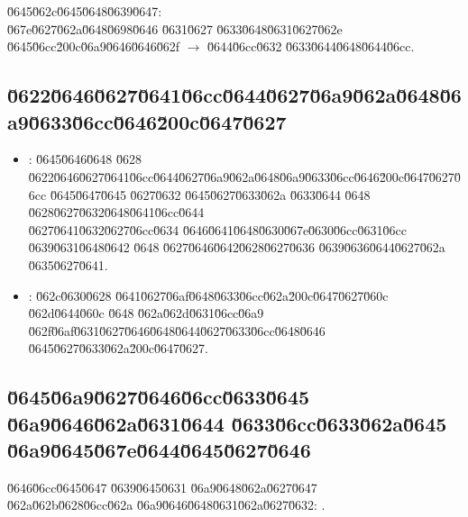\documentclass[12pt,a4paper]{article}
\begin{document}
\u0645\u062c\u0645\u0648\u0639\u0647:  \\
\u067e\u0627\u062a\u0648\u0698\u0646 \u0631\u0627 \u0633\u0648\u0631\u0627\u062e \u0645\u06cc\u200c\u06a9\u0646\u0646\u062f $\rightarrow$ \u0644\u06cc\u0632 \u0633\u0644\u0648\u0644\u06cc.

\subsection*{\u0622\u0646\u0627\u0641\u06cc\u0644\u0627\u06a9\u062a\u0648\u06a9\u0633\u06cc\u0646\u200c\u0647\u0627}
\begin{itemize}
\item {}: \u0645\u0646\u0648 \u0628 \u0622\u0646\u0627\u0641\u06cc\u0644\u0627\u06a9\u062a\u0648\u06a9\u0633\u06cc\u0646\u200c\u0647\u0627\u06cc \u0645\u0647\u0645 \u0627\u0632 \u0645\u0627\u0633\u062a \u0633\u0644 \u0648 \u0628\u0627\u0632\u0648\u0641\u06cc\u0644 \\
\u0627\u0641\u0632\u0627\u06cc\u0634 \u0646\u0641\u0648\u0630\u067e\u0630\u06cc\u0631\u06cc \u0639\u0631\u0648\u0642 \u0648 \u0627\u0646\u0642\u0628\u0627\u0636 \u0639\u0636\u0644\u0627\u062a \u0635\u0627\u0641.
\item {}: \u062c\u0630\u0628 \u0641\u0627\u06af\u0648\u0633\u06cc\u062a\u200c\u0647\u0627\u060c \u062d\u0644\u060c \u0648 \u062a\u062d\u0631\u06cc\u06a9 \u062f\u06af\u0631\u0627\u0646\u0648\u0644\u0627\u0633\u06cc\u0648\u0646 \u0645\u0627\u0633\u062a\u200c\u0647\u0627.
\end{itemize}

\subsection*{\u0645\u06a9\u0627\u0646\u06cc\u0633\u0645 \u06a9\u0646\u062a\u0631\u0644 \u0633\u06cc\u0633\u062a\u0645 \u06a9\u0645\u067e\u0644\u0645\u0627\u0646}
\u0646\u06cc\u0645\u0647 \u0639\u0645\u0631 \u06a9\u0648\u062a\u0627\u0647  \\
\u062a\u062b\u0628\u06cc\u062a  \u06a9\u0646\u0648\u0631\u062a\u0627\u0632: .

\end{document}
